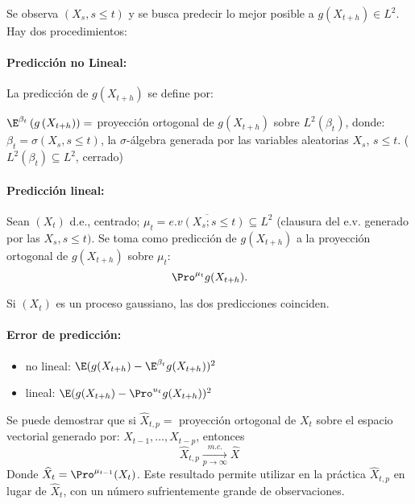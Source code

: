 Se observa $\left( {X_{s}, s\leq t} \right)$ y se busca predecir lo mejor posible a $g\left( {X_{t+h} } \right)\in L^{2}$. Hay dos procedimientos:

\paragraph{Predicci\'{o}n no Lineal:}
La predicci\'{o}n de $g\left( {X_{t+h} } \right)$ se define por:\newline

$\E^{\beta_{t} }\left( {g\left( {X_{t+h} } \right)} \right)=$ 
proyecci\'{o}n ortogonal de $g\left( {X_{t+h} } \right)$ sobre $L^{2}\left( 
{\beta_{t} } \right)$, donde: $\beta_{t} =\sigma (X_{s} ,s\leq t)$, la 
$\sigma$-\'{a}lgebra generada por las variables aleatorias $X_{s} $, $s\leq 
t.$ ($L^{2}\left( {\beta_{t} } \right)\subseteq L^{2}$, cerrado)

\paragraph{Predicci\'{o}n lineal:}\newline

Sean $(X_{t} )$ d.e., centrado; $\mu_{t} =\overline {e.v(X_{s} ;s\leq t)} 
\subseteq L^{2}$ (clausura del e.v. generado por las $X_{s} ,s\leq t)$. Se 
toma como predicci\'{o}n de $g(X_{t+h})$ a la proyecci\'{o}n 
ortogonal de $g(X_{t+h} )$ sobre $\mu_{t}$:
\[
\Pro^{\mu_{t} } g(X_{t+h} ).
\]

\begin{observacion}
 Si $(X_{t})$ es un proceso gaussiano, las dos predicciones coinciden.
\end{observacion}

\paragraph{Error de predicci\'{o}n:}
\begin{itemize}
\item no lineal: $\E(g(X_{t+h} )-\E^{\beta_{t} }g(X_{t+h} ))^{2}$
\item lineal: $\E(g(X_{t+h} )-\Pro^{u_{t} } g(X_{t+h} ))^{2}$
\end{itemize}

\begin{observacion}
Se puede demostrar que si $\widehat{X}_{t,p} 
=$ proyecci\'{o}n ortogonal de $X_{t} $ sobre el espacio vectorial 
generado por: $X_{t-1} ,\ldots,X_{t-p} $, entonces 
\[
 \widehat{X}_{t,p}\xrightarrow[p\to \infty]{m.c.} \widehat{X}
\]
Donde $\widehat{X}_{t} =\Pro^{\mu_{t-1} }(X_{t} )$. Este 
resultado permite utilizar en la pr\'{a}ctica $\widehat{X}_{t,p}$ en lugar de 
$\widehat{X}_{t}$, con un n\'{u}mero sufrientemente grande de observaciones.
\end{observacion}

